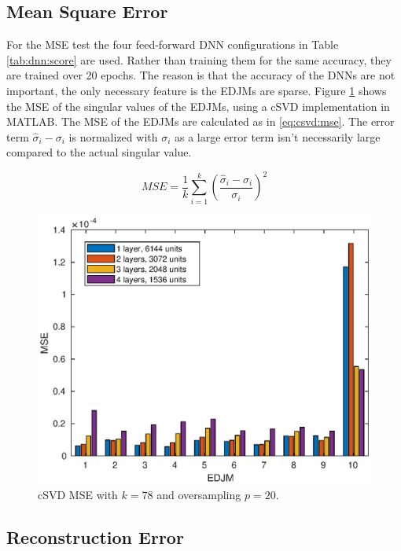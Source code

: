 \newpage

\subsection*{Mean Square Error}

For the MSE test the four feed-forward DNN configurations in Table \ref{tab:dnn:score} are used. Rather than training them for the same accuracy, they are trained over 20 epochs. The reason is that the accuracy of the DNNs are not important, the only necessary feature is the EDJMs are sparse. Figure \ref{fig:csvd:mse} shows the MSE of the singular values of the EDJMs, using a cSVD implementation in MATLAB. The MSE of the EDJMs are calculated as in \eqref{eq:csvd:mse}. The error term $\hat \sigma_i - \sigma_i$ is normalized with $\sigma_i$ as a large error term isn't necessarily large compared to the actual singular value. 

\begin{equation}
  \label{eq:csvd:mse}
    MSE = \frac{1}{k} \sum_{i=1}^{k} \left ( \frac{\hat \sigma_i - \sigma_i}{\sigma_i} \right )^2
\end{equation}
  
\begin{figure}[H]
  \centering
  \includegraphics[scale=0.6]{Figures/csvd_mse.eps}
  \caption{cSVD MSE with $k=78$ and oversampling $p=20$.}
  \label{fig:csvd:mse}
\end{figure}

\subsection*{Reconstruction Error}

